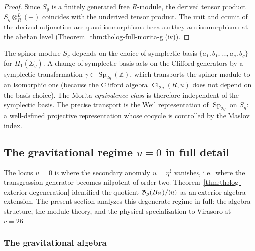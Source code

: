 \begin{proof}
Since $S_g$ is a finitely generated free $R$-module, the
derived tensor product $S_g \otimes_R^L (-)$ coincides with the
underived tensor product.
The unit and counit of the derived adjunction are
quasi-isomorphisms because they are isomorphisms at the
abelian level
(Theorem~\ref{thm:tholog-full-morita-g}(iv)).
\end{proof}

\begin{remark}
The spinor module $S_g$ depends on the choice of symplectic
basis $\{a_1,b_1,\dots,a_g,b_g\}$ for $H_1(\Sigma_g)$.
A change of symplectic basis acts on the Clifford generators
by a symplectic transformation $\gamma \in \operatorname{Sp}_{2g}(\mathbb{Z})$,
which transports the spinor module to an isomorphic one
(because the Clifford algebra $\operatorname{Cl}_{2g}(R,u)$ does
not depend on the basis choice).
The Morita \emph{equivalence class} is therefore independent
of the symplectic basis.
The precise transport is the Weil representation of
$\operatorname{Sp}_{2g}$ on $S_g$: a well-defined projective
representation whose cocycle is controlled by the Maslov index.
\end{remark}

\subsection{The gravitational regime $u = 0$ in full detail}


The locus $u = 0$ is where the secondary anomaly
$u = \eta^2$ vanishes, i.e.\ where the transgression generator
becomes nilpotent of order two.
Theorem~\ref{thm:tholog-exterior-degeneration} identified the
quotient $\mathfrak{G}_g(B_\Theta)/(u)$ as an exterior algebra extension.
The present section analyzes this degenerate regime in full:
the algebra structure, the module theory, and the physical
specialization to Virasoro at $c = 26$.

\subsubsection{The gravitational algebra}

